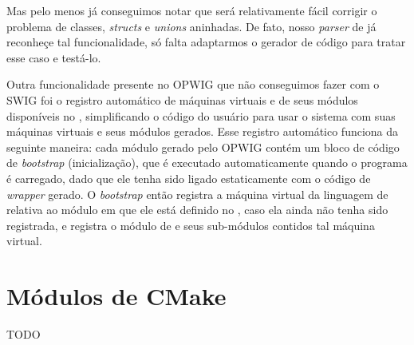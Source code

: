   Mas pelo menos já conseguimos notar que será relativamente fácil corrigir o problema de classes, 
  \textit{structs} e \textit{unions} aninhadas. De fato, nosso \textit{parser} de \CXX{} já reconheçe
  tal funcionalidade, só falta adaptarmos o gerador de código para tratar esse caso e testá-lo.
  
  Outra funcionalidade presente no OPWIG que não conseguimos fazer com o SWIG foi o registro automático
  de máquinas virtuais e de seus módulos disponíveis no \SMgr{}, simplificando o código do usuário
  para usar o sistema com suas máquinas virtuais e seus módulos gerados. Esse registro automático
  funciona da seguinte maneira: cada módulo gerado pelo OPWIG contém um bloco de código de \textit{bootstrap}
  (inicialização), que é executado automaticamente quando o programa é carregado, dado que ele tenha
  sido ligado estaticamente com o código de \textit{wrapper} gerado. O \textit{bootstrap} então
  registra a máquina virtual da linguagem de \script{} relativa ao módulo em que ele está definido
  no \SMgr{}, caso ela ainda não tenha sido registrada, e registra o módulo de \script{} e seus sub-módulos
  contidos tal máquina virtual.
  
  \section{Módulos de CMake}
  
  TODO
